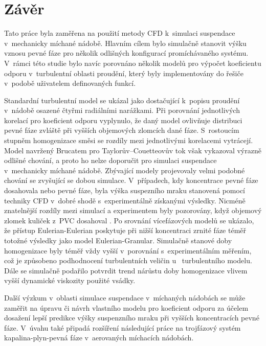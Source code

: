 \chapter{Závěr}
Tato práce byla zaměřena na použití metody CFD k~simulaci suspendace v~mechanicky míchané nádobě. Hlavním cílem bylo simulačně stanovit výšku vznosu pevné fáze pro několik odlišných konfigurací promíchávaného systému. V~rámci této studie bylo navíc porovnáno několik modelů pro výpočet koeficientu odporu v~turbulentní oblasti proudění, který byly implementovány do řešiče \flu{} v~podobě uživatelem definovaných funkcí.

Standardní \keps{} turbulentní model se ukázal jako dostačující k~popisu proudění v~nádobě osazené čtyřmi radiálními narážkami. Při porovnání jednotlivých korelací pro koeficient odporu vyplynulo, že daný model ovlivňuje distribuci pevné fáze zvláště při vyšších objemových zlomcích dané fáze. S~rostoucím stupněm homogenizace směsi se rozdíly mezi jednotlivými korelacemi vytrácejí. Model navržený Brucatem pro Taylorův–Couetteovův tok však vykazoval výrazně odlišné chování, a proto ho nelze doporučit pro simulaci suspendace v~mechanicky míchané nádobě. Zbývající modely projevovaly velmi podobné chování se zvyšující se dobou simulace. V~případech, kdy koncentrace pevné fáze dosahovala  nebo  pevné fáze, byla výška suspezního mraku stanovená pomocí techniky CFD v~dobré shodě s~experimentálně získanými výsledky. Nicméně znatelnější rozdíly mezi simulací a experimentem byly pozorovány, když objemový zlomek kuliček z~PVC dosahoval . Po srovnání více\-fá\-zo\-vých modelů se ukázalo, že přístup Eulerian-Eulerian poskytuje při nižší koncentraci zrnité fáze téměř totožné výsledky jako model Eulerian-Granular. Simulačně stanové doby homogenizace byly téměř vždy vyšší v~porovnání s~experimentálním měřením, což je způsobeno podhodnocení turbulentních veličin u~\keps{} turbulentního modelu. Dále se simulačně podařilo potvrdit trend nárůstu doby homogenizace vlivem vyšší dynamické viskozity použité vsádky.

Další výzkum v~oblasti simulace suspendace v~míchaných nádobách se může zaměřit na úpravu či návrh vlastního modelu pro koeficient odporu za účelem dosažení lepší predikce výšky suspenzního mraku při vyšších koncentracích pevné fáze. V~úvahu také připadá rozšíření následující práce na trojfázový systém kapalina-plyn-pevná fáze v~ae\-ro\-va\-ných mí\-cha\-cích ná\-do\-bách.
